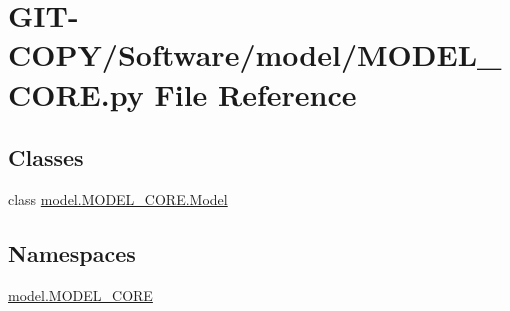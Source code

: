 \hypertarget{GIT-COPY_2Software_2model_2MODEL__CORE_8py}{}\section{G\+I\+T-\/\+C\+O\+P\+Y/\+Software/model/\+M\+O\+D\+E\+L\+\_\+\+C\+O\+R\+E.py File Reference}
\label{GIT-COPY_2Software_2model_2MODEL__CORE_8py}
\subsection*{Classes}
\begin{DoxyCompactItemize}
\item 
class \hyperlink{classmodel_1_1MODEL__CORE_1_1Model}{model.\+M\+O\+D\+E\+L\+\_\+\+C\+O\+R\+E.\+Model}
\end{DoxyCompactItemize}
\subsection*{Namespaces}
\begin{DoxyCompactItemize}
\item 
 \hyperlink{namespacemodel_1_1MODEL__CORE}{model.\+M\+O\+D\+E\+L\+\_\+\+C\+O\+R\+E}
\end{DoxyCompactItemize}
